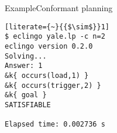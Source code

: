 \begin{frame}[fragile]{Example}{Conformant planning}
\begin{lstlisting}[literate={~}{{$\sim$}}1]
$ eclingo yale.lp -c n=2
eclingo version 0.2.0
Solving...
Answer: 1
&k{ occurs(load,1) } 
&k{ occurs(trigger,2) } 
&k{ goal }
SATISFIABLE

Elapsed time: 0.002736 s
\end{lstlisting}
\end{frame}
%

